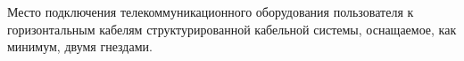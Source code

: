 Место подключения телекоммуникационного
оборудования пользователя к горизонтальным кабелям
структурированной кабельной системы, оснащаемое, как
минимум, двумя гнездами.